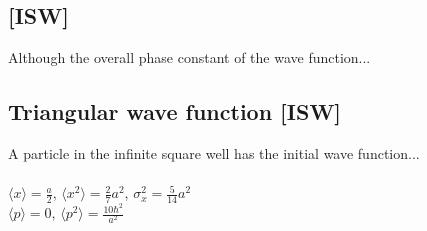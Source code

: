 \documentclass{article}
\newcommand{\<}{\langle}
\renewcommand{\>}{\rangle}
\begin{document}
\subsection{[ISW]}
Although the overall phase constant of the wave function...
\subsection{Triangular wave function [ISW]}
A particle in the infinite square well has the initial wave function...
\\ \\
$\<x\> = \frac{a}{2}$, 
$\<x^2\> = \frac{2}{7} a^2$,
$\sigma_x^2 = \frac{5}{14} a^2$ \\
$\<p\> = 0$, 
$\<p^2\> = \frac{10 \hbar^2}{a^2}$ \\
\end{document}
